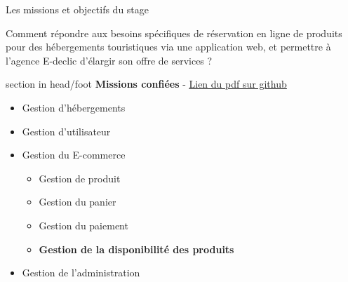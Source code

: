 \documentclass{beamer}
\begin{document}
\begin{frame}{Les missions et objectifs du stage}

	Comment répondre aux besoins spécifiques de réservation en ligne de produits pour des hébergements touristiques via une application web, et permettre à l’agence E-declic d’élargir son offre de services ?
			
	\begin{center}
  		\begin{minipage}{0.9\textwidth}
			\begin{beamercolorbox}[wd=\paperwidth,ht=1.5em,dp=0.5em,leftskip=0.5cm]{section in head/foot}
  				\large \textbf{Missions confiées} - \href{https://github.com/Matteo-K/Soutenance_E-delic/blob/main/pdf/cc-painspizzas-camping.pdf}{\underline{\normalsize Lien du pdf sur github}}
			\end{beamercolorbox}
			\begin{itemize}
				\item<1-> Gestion d'hébergements
				\item<2-> Gestion d'utilisateur
				\item<3-> Gestion du E-commerce
				\begin{itemize}
					\item Gestion de produit
					\item Gestion du panier
					\item Gestion du paiement
					\item \textbf{Gestion de la disponibilité des produits}
				\end{itemize}
				\item<4-> Gestion de l'administration
			\end{itemize}
  		\end{minipage}
  		\vspace{1cm}
	\end{center}
	\vfill
\end{frame}
\end{document}

